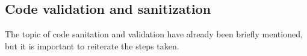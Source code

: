 \subsection{Code validation and sanitization}
The topic of code sanitation and validation have already been briefly mentioned, but it is important to reiterate the steps taken. 























